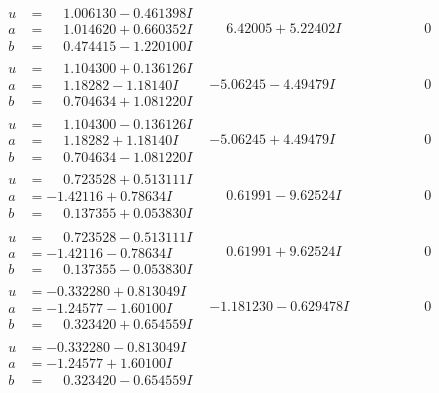 \documentclass[1p]{elsarticle_modified}
\theoremstyle{definition}
\begin{document}
$$\begin{array}{c|c|c}
\begin{aligned}
u &= \phantom{-}1.006130 - 0.461398 I \\
a &= \phantom{-}1.014620 + 0.660352 I \\
b &= \phantom{-}0.474415 - 1.220100 I\end{aligned}
 & \phantom{-}6.42005 + 5.22402 I & \phantom{-0.000000 } 0 \\ \hline\begin{aligned}
u &= \phantom{-}1.104300 + 0.136126 I \\
a &= \phantom{-}1.18282 - 1.18140 I \\
b &= \phantom{-}0.704634 + 1.081220 I\end{aligned}
 & -5.06245 - 4.49479 I & \phantom{-0.000000 } 0 \\ \hline\begin{aligned}
u &= \phantom{-}1.104300 - 0.136126 I \\
a &= \phantom{-}1.18282 + 1.18140 I \\
b &= \phantom{-}0.704634 - 1.081220 I\end{aligned}
 & -5.06245 + 4.49479 I & \phantom{-0.000000 } 0 \\ \hline\begin{aligned}
u &= \phantom{-}0.723528 + 0.513111 I \\
a &= -1.42116 + 0.78634 I \\
b &= \phantom{-}0.137355 + 0.053830 I\end{aligned}
 & \phantom{-}0.61991 - 9.62524 I & \phantom{-0.000000 } 0 \\ \hline\begin{aligned}
u &= \phantom{-}0.723528 - 0.513111 I \\
a &= -1.42116 - 0.78634 I \\
b &= \phantom{-}0.137355 - 0.053830 I\end{aligned}
 & \phantom{-}0.61991 + 9.62524 I & \phantom{-0.000000 } 0 \\ \hline\begin{aligned}
u &= -0.332280 + 0.813049 I \\
a &= -1.24577 - 1.60100 I \\
b &= \phantom{-}0.323420 + 0.654559 I\end{aligned}
 & -1.181230 - 0.629478 I & \phantom{-0.000000 } 0 \\ \hline\begin{aligned}
u &= -0.332280 - 0.813049 I \\
a &= -1.24577 + 1.60100 I \\
b &= \phantom{-}0.323420 - 0.654559 I\end{aligned}

\end{array}$$
\end{document}
